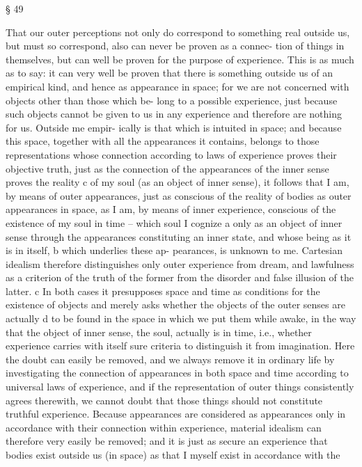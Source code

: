 § 49

That our outer perceptions not only do correspond to something real
outside us, but must so correspond, also can never be proven as a connec-
tion of things in themselves, but can well be proven for the purpose of
experience. This is as much as to say: it can very well be proven that there
is something outside us of an empirical kind, and hence as appearance in
space; for we are not concerned with objects other than those which be-
long to a possible experience, just because such objects cannot be given to
us in any experience and therefore are nothing for us. Outside me empir-
ically is that which is intuited in space; and because this space, together
with all the appearances it contains, belongs to those representations
whose connection according to laws of experience proves their objective
truth, just as the connection of the appearances of the inner sense proves
the reality c of my soul (as an object of inner sense), it follows that I am,
by means of outer appearances, just as conscious of the reality of bodies
as outer appearances in space, as I am, by means of inner experience,
conscious of the existence of my soul in time – which soul I cognize a
only as an object of inner sense through the appearances constituting an
inner state, and whose being as it is in itself, b which underlies these ap-
pearances, is unknown to me. Cartesian idealism therefore distinguishes
only outer experience from dream, and lawfulness as a criterion of the
truth of the former from the disorder and false illusion of the latter. c In
both cases it presupposes space and time as conditions for the existence
of objects and merely asks whether the objects of the outer senses are
actually d to be found in the space in which we put them while awake,
in the way that the object of inner sense, the soul, actually is in time,
i.e., whether experience carries with itself sure criteria to distinguish it
from imagination. Here the doubt can easily be removed, and we always
remove it in ordinary life by investigating the connection of appearances
in both space and time according to universal laws of experience, and
if the representation of outer things consistently agrees therewith, we
cannot doubt that those things should not constitute truthful experience.
Because appearances are considered as appearances only in accordance
with their connection within experience, material idealism can therefore
very easily be removed; and it is just as secure an experience that bodies
exist outside us (in space) as that I myself exist in accordance with the
